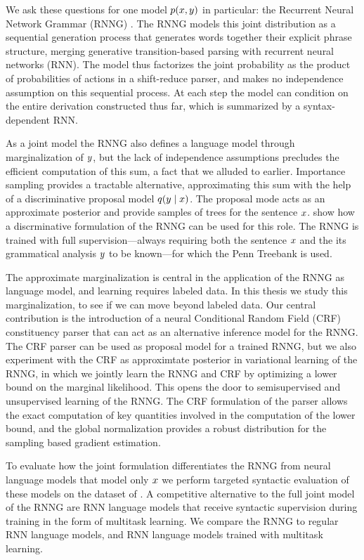   We ask these questions for one model $p(x, y)$ in particular: the Recurrent Neural Network Grammar (RNNG) \citep{dyer2016rnng}. The RNNG models this joint distribution as a sequential generation process that generates words together their explicit phrase structure, merging generative transition-based parsing with recurrent neural networks (RNN). The model thus factorizes the joint probability as the product of probabilities of actions in a shift-reduce parser, and makes no independence assumption on this sequential process. At each step the model can condition on the entire derivation constructed thus far, which is summarized by a syntax-dependent RNN.

  As a joint model the RNNG also defines a language model through marginalization of $y$, but the lack of independence assumptions precludes the efficient computation of this sum, a fact that we alluded to earlier. Importance sampling provides a tractable alternative, approximating this sum with the help of a discriminative proposal model $q(y \mid x)$. The proposal mode acts as an approximate posterior and provide samples of trees for the sentence $x$. \citet{dyer2016rnng} show how a discrminative formulation of the RNNG can be used for this role. The RNNG is trained with full supervision---always requiring both the sentence $x$ and the its grammatical analysis $y$ to be known---for which the Penn Treebank \citep{marcus1993penn} is used.

  The approximate marginalization is central in the application of the RNNG as language model, and learning requires labeled data. In this thesis we study this marginalization, to see if we can move beyond labeled data. Our central contribution is the introduction of a neural Conditional Random Field (CRF) constituency parser that can act as an alternative inference model for the RNNG. The CRF parser can be used as proposal model for a trained RNNG, but we also experiment with the CRF as approximtate posterior in variational learning of the RNNG, in which we jointly learn the RNNG and CRF by optimizing a lower bound on the marginal likelihood. This opens the door to semisupervised and unsupervised learning of the RNNG. The CRF formulation of the parser allows the exact computation of key quantities involved in the computation of the lower bound, and the global normalization provides a robust distribution for the sampling based gradient estimation.

  To evaluate how the joint formulation differentiates the RNNG from neural language models that model only $x$ we perform targeted syntactic evaluation of these models on the dataset of \citep{linzen2018targeted}. A competitive alternative to the full joint model of the RNNG are RNN language models that receive syntactic supervision during training in the form of multitask learning. We compare the RNNG to regular RNN language models, and RNN language models trained with multitask learning.

